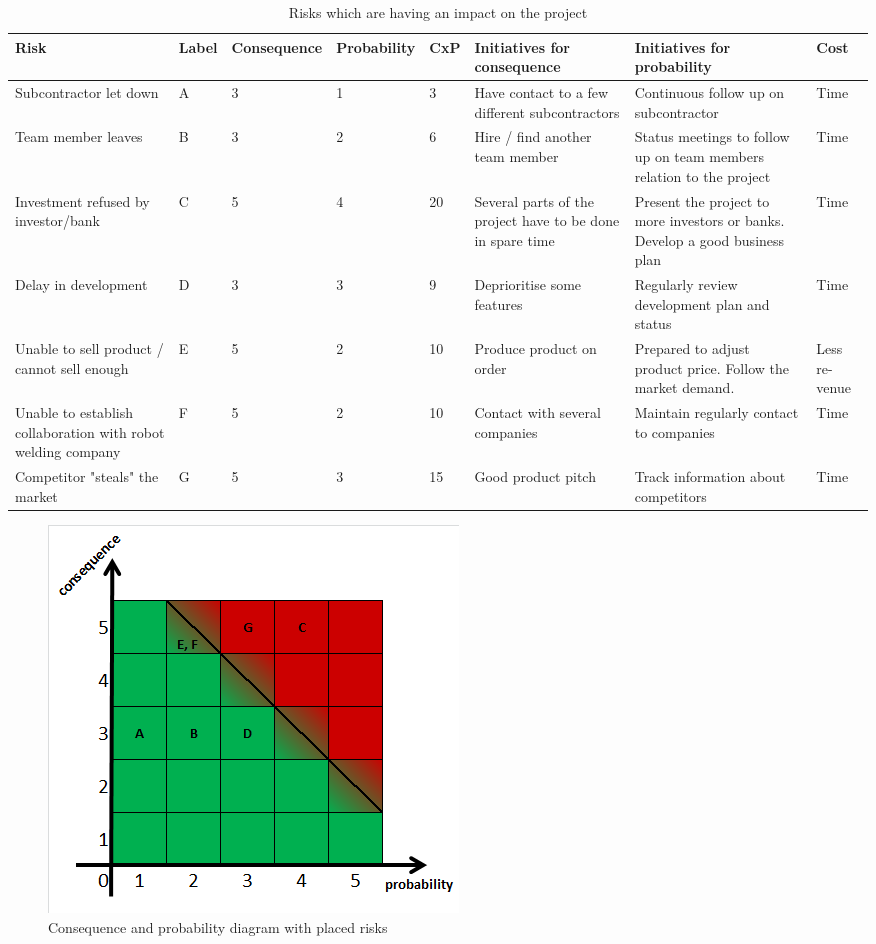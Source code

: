 \def\arraystretch{1.7}
\begin{table}[h!]
\centering
\scriptsize
\begin{tabular}{|p{2.9cm} |p{0.4cm} |p{0.9cm} |p{0.9cm} |p{0.5cm} |p{3cm} |p{3cm} |p{0.7cm}|} 
\hline
Risk 	&	La\-bel	& Conse\-quence	& Prob\-ability	& CxP	& Initiatives \newline for consequence	& Initiatives \newline for probability	& Cost \\ \hline
Subcontractor let down & A & 3 & 1 & 3 & Have contact to a few different subcontractors & Continuous follow up on subcontractor & Time\\ \hline
Team member leaves     & B & 3 & 2 & 6 & Hire / find another team member & Status meetings to follow up on team members relation to the project & Time\\ \hline
Investment refused by investor/bank & C	& 5	&	4 & 20	& Several parts of the project have to be done in spare time & Present the project to more investors or banks. Develop a good business plan & Time\\  \hline
Delay in development & D & 3 & 3 & 9 & Deprioritise some features & Regularly review development plan and status & Time\\ \hline
Unable to sell product / cannot sell enough & E & 5 & 2 & 10 & Produce product on order & Prepared to adjust product price. Follow the market demand. & Less re-\newline venue\\ \hline
Unable to establish collaboration with robot welding company & F & 5 & 2 & 10 & Contact with several companies & Maintain regularly contact to companies  & Time \\ \hline
Competitor "steals" the market & G & 5 & 3 & 15 & Good product pitch & Track information about competitors & Time\\ \hline
\end{tabular}
\caption{Risks which are having an impact on the project}
\label{riskshort}
\end{table}
\def\arraystretch{1}


\begin{figure}[h!]
\centering
\includegraphics[scale=0.6]{./graphics/cxp}
\caption{Consequence and probability diagram with placed risks}
\label{cxp}
\end{figure}
